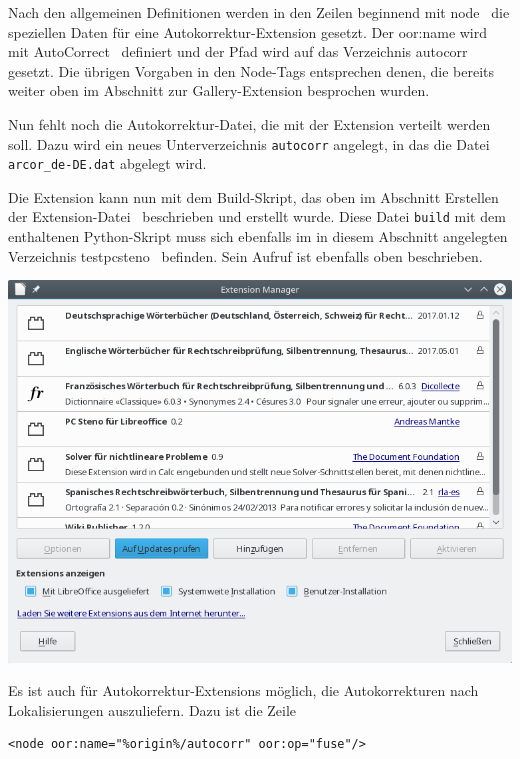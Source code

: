 \documentclass[a4paper,10pt,pagesize,titlepage]{scrbook}
\begin{document}
Nach den allgemeinen Definitionen werden in den Zeilen beginnend mit \glqq node\grqq~ die speziellen Daten für eine Autokorrektur-Extension gesetzt. Der oor:name wird mit \glqq AutoCorrect\grqq~ definiert und der Pfad wird auf das Verzeichnis \glqq autocorr\grqq~ gesetzt. Die übrigen Vorgaben in den Node-Tags entsprechen denen, die bereits weiter oben im Abschnitt zur Gallery-Extension besprochen wurden.

Nun fehlt noch die Autokorrektur-Datei, die mit der Extension verteilt werden soll. Dazu wird ein neues Unterverzeichnis \verb|autocorr| angelegt, in das die Datei \verb|arcor_de-DE.dat| abgelegt wird.

Die Extension kann nun mit dem Build-Skript, das oben im Abschnitt \glqq Erstellen der Extension-Datei\grqq~ beschrieben und erstellt wurde. Diese Datei \verb|build| mit dem enthaltenen Python-Skript muss sich ebenfalls im in diesem Abschnitt angelegten Verzeichnis \glqq testpcsteno\grqq~ befinden. Sein Aufruf ist ebenfalls oben beschrieben.

\begin{center}
	\includegraphics[width=0.9\linewidth]{pics/extensionmanager_autocorrect_extension_installed01}
	\label{fig:autocorr_extension_extension_manager}
\end{center}



Es ist auch für Autokorrektur-Extensions möglich, die Autokorrekturen nach Lokalisierungen auszuliefern. Dazu ist die Zeile
\begin{lstlisting}
<node oor:name="%origin%/autocorr" oor:op="fuse"/>
\end{lstlisting}
\end{document}
